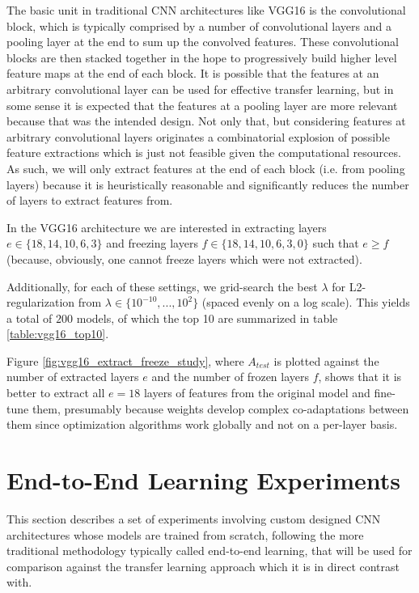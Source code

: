 The basic unit in traditional \ac{CNN} architectures like VGG16 is the convolutional block, which is typically comprised by a number of convolutional layers and a pooling layer at the end to sum up the convolved features. These convolutional blocks are then stacked together in the hope to progressively build higher level feature maps at the end of each block. It is possible that the features at an arbitrary convolutional layer can be used for effective transfer learning, but in some sense it is expected that the features at a pooling layer are more relevant because that was the intended design. Not only that, but considering features at arbitrary convolutional layers originates a combinatorial explosion of possible feature extractions which is just not feasible given the computational resources. As such, we will only extract features at the end of each block (i.e. from pooling layers) because it is heuristically reasonable and significantly reduces the number of layers to extract features from.

In the VGG16 architecture we are interested in extracting layers $e \in \{18,14,10,6,3\}$ and freezing layers $f \in \{18,14,10,6,3,0\}$ such that $e \geq f$ (because, obviously, one cannot freeze layers which were not extracted).

Additionally, for each of these settings, we grid-search the best $\lambda$ for L2-regularization from $\lambda \in \{10^{-10}, ..., 10^{2}\}$ (spaced evenly on a log scale). This yields a total of $200$ models, of which the top 10 are summarized in table \ref{table:vgg16_top10}.

Figure \ref{fig:vgg16_extract_freeze_study}, where $A_{test}$ is plotted against the number of extracted layers $e$ and the number of frozen layers $f$, shows that it is better to extract all $e = 18$ layers of features from the original model and fine-tune them, presumably because weights develop complex co-adaptations between them since optimization algorithms work globally and not on a per-layer basis.

\section{End-to-End Learning Experiments}

This section describes a set of experiments involving custom designed \ac{CNN} architectures whose models are trained from scratch, following the more traditional methodology typically called end-to-end learning, that will be used for comparison against the transfer learning approach which it is in direct contrast with.

